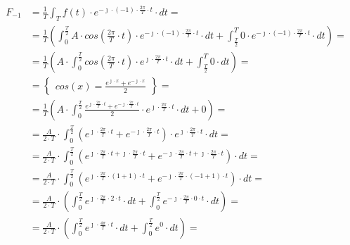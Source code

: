 \begin{task}


\begin{align*}
F_{-1}&=\frac{1}{T}\int_{T}f(t) \cdot e^{-\jmath \cdot (-1) \cdot \frac{2\pi}{T} \cdot t} \cdot dt=\\
&=\frac{1}{T}\left( \int_{0}^{\frac{T}{2}}A \cdot cos\left( \frac{2\pi}{T} \cdot t\right) \cdot e^{ - \jmath \cdot (-1) \cdot \frac{2\pi}{T} \cdot t} \cdot dt + \int_{\frac{T}{2}}^{T} 0 \cdot e^{ - \jmath \cdot (-1) \cdot \frac{2\pi}{T} \cdot t} \cdot dt\right)=\\
&=\frac{1}{T}\left( A \cdot  \int_{0}^{\frac{T}{2}}cos\left( \frac{2\pi}{T} \cdot t\right) \cdot e^{ \jmath \cdot \frac{2\pi}{T} \cdot t} \cdot dt + \int_{\frac{T}{2}}^{T} 0 \cdot dt\right)=\\
&=\begin{Bmatrix}
cos\left(x\right) = \frac{e^{\jmath \cdot x}+e^{-\jmath \cdot x}}{2}
\end{Bmatrix}=\\
&=\frac{1}{T}\left( A \cdot  \int_{0}^{\frac{T}{2}} \frac{e^{\jmath \cdot \frac{2\pi}{T} \cdot t}+e^{-\jmath \cdot \frac{2\pi}{T} \cdot t}}{2} \cdot e^{ \jmath \cdot \frac{2\pi}{T} \cdot t} \cdot dt + 0\right)=\\
&=\frac{A}{2\cdot T}\cdot  \int_{0}^{\frac{T}{2}} \left(e^{\jmath \cdot \frac{2\pi}{T} \cdot t}+e^{-\jmath \cdot \frac{2\pi}{T} \cdot t}\right) \cdot e^{ \jmath \cdot \frac{2\pi}{T} \cdot t} \cdot dt =\\
&=\frac{A}{2\cdot T}\cdot  \int_{0}^{\frac{T}{2}} \left(e^{\jmath \cdot \frac{2\pi}{T} \cdot t + \jmath \cdot \frac{2\pi}{T} \cdot t}+e^{-\jmath \cdot \frac{2\pi}{T} \cdot t + \jmath \cdot \frac{2\pi}{T} \cdot t}\right) \cdot dt =\\
&=\frac{A}{2\cdot T}\cdot  \int_{0}^{\frac{T}{2}} \left(e^{\jmath \cdot \frac{2\pi}{T} \cdot \left(1 + 1\right) \cdot t}+e^{-\jmath \cdot \frac{2\pi}{T} \cdot \left(-1+1\right)\cdot t }\right) \cdot dt =\\
&=\frac{A}{2\cdot T}\cdot \left( \int_{0}^{\frac{T}{2}} e^{\jmath \cdot \frac{2\pi}{T} \cdot 2 \cdot t} \cdot dt + \int_{0}^{\frac{T}{2}} e^{-\jmath \cdot \frac{2\pi}{T} \cdot 0 \cdot t } \cdot dt \right)=\\
&=\frac{A}{2\cdot T}\cdot \left( \int_{0}^{\frac{T}{2}} e^{\jmath \cdot \frac{4\pi}{T} \cdot t } \cdot dt +  \int_{0}^{\frac{T}{2}} e^{0} \cdot dt\right)=\\

\end{align*}
\end{task}
